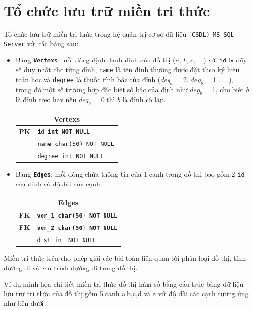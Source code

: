 \section{Tổ chức lưu trữ miền tri thức} 
	Tổ chức lưu trữ miền tri thức trong hệ quản trị cơ sở dữ liệu \texttt{(CSDL) MS SQL Server} với các bảng sau:

\begin{itemize}
	\item Bảng \textbf{\texttt{Vertexs}}: mỗi dòng định danh đỉnh của đồ thị ($a$, $b$, $c$, $\dots$) với \texttt{id} là dãy số duy nhất cho từng đỉnh, \texttt{name} là tên đỉnh thường được đặt theo ký hiệu toán học và \texttt{degree} là thuộc tính bậc của đỉnh (${deg_a}$ = 2, ${deg_b}$ = 1 , $\dots$), trong đó một số trường hợp đặc biệt số bậc của đỉnh như ${deg_b}$ = 1, cho biết $b$ là đỉnh treo hay nếu ${deg_b}$ = 0 thì  $b$ là đỉnh cô lập.
	
	\begin{tabular}{|c|l|}
		\hline
		\multicolumn{2}{|c|}{\textbf{Vertexs}} \\
		\hline
		\textbf{PK} & \texttt{\textbf{id int NOT NULL}} \\
		\hline
		& \texttt{name char(50) NOT NULL} \\
		\hline
		& \texttt{degree int NOT NULL} \\
		\hline
	\end{tabular}
	
	\item Bảng \textbf{\texttt{Edges}}: mỗi dòng chứa thông tin của 1 cạnh trong đồ thị bao gồm 2 \texttt{id} của đỉnh và độ dài của cạnh.
	
	\begin{tabular}{|c|l|}
		\hline
		\multicolumn{2}{|c|}{\textbf{Edges}} \\
		\hline
		\textbf{FK} & \texttt{\textbf{ver\_1 char(50) NOT NULL}} \\
		\hline
		\textbf{FK} & \texttt{\textbf{ver\_2 char(50) NOT NULL}} \\
		\hline
		& \texttt{dist int NOT NULL} \\
		\hline
	\end{tabular}
	
\end{itemize}		
Miền tri thức trên cho phép giải các bài toán liên quan tới phân loại đồ thị, tính đường đi và chu trình đường đi trong đồ thị.

Ví dụ minh họa chi tiết miền tri thức đồ thị hàm số bằng cấu trúc bảng dữ liệu lưu trữ tri thức của đồ thị gồm 5 cạnh a,b,c,d và e với độ dài các cạnh tương ứng như bên dưới

